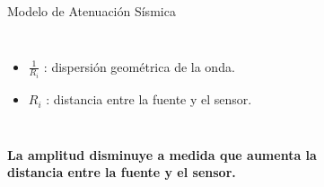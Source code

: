 \begin{frame}{Modelo de Atenuación Sísmica}
\begin{columns}[T]
\begin{itemize}
            \item $\frac{1}{R_i}$ : dispersión geométrica de la onda.
            \vspace{0.3cm}
            
            \item $R_i$ : distancia entre la fuente y el sensor.
        \end{itemize}
        
    \end{columns}
    
    \vspace{0.4cm}
    
    \begin{center}
        \textbf{
            La amplitud disminuye a medida que aumenta la \\ distancia entre la fuente y el sensor.
        }
    \end{center}

\end{frame}